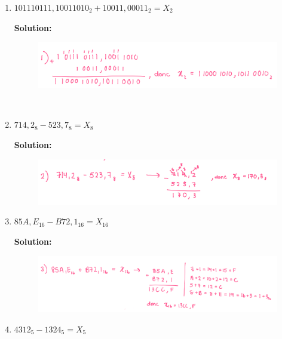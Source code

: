 \documentclass{article}
\begin{document}
\begin{enumerate}[label=\alph*), itemsep=2em]

  \item  $101110111,10011010_{2} + 10011,00011_{2} = X_{2}$
  
  \textbf{Solution:}
  \begin{figure}[h!]
    \centering
    \includegraphics[width=1\textwidth]{images/binary_addition_q3_1.png}
  \end{figure}
  \\

  \item $714,2_{8} - 523,7_{8} = X_{8}$
 
  \textbf{Solution:}
  \begin{figure}[h!]
    \centering
    \includegraphics[width=1\textwidth]{images/octonary_substraction_q3_2.png}
  \end{figure}

  \item $85A,E_{16} - B72,1_{16} = X_{16}$
 
  \textbf{Solution:}
  \begin{figure}[h!]
    \centering
    \includegraphics[width=1\textwidth]{images/hexadecimal_addition_q3_3.png}
  \end{figure}

  \newpage

  \item $4312_{5} - 1324_{5} = X_{5}$
 

\end{enumerate}
\end{document}
